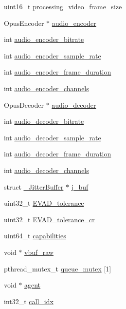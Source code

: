 \begin{DoxyCompactItemize}
\item 
uint16\+\_\+t \hyperlink{struct___c_s_session_a7048faa402d6aecd2626ed85f352f5f2}{processing\+\_\+video\+\_\+frame\+\_\+size}
\item 
Opus\+Encoder $\ast$ \hyperlink{struct___c_s_session_a8c1fa3d73f3426ba5cac83857c390ebc}{audio\+\_\+encoder}
\item 
int \hyperlink{struct___c_s_session_a8951572b99eec737269f5de96f9c5320}{audio\+\_\+encoder\+\_\+bitrate}
\item 
int \hyperlink{struct___c_s_session_ae40829dc4300d79d3b175c8770b769a4}{audio\+\_\+encoder\+\_\+sample\+\_\+rate}
\item 
int \hyperlink{struct___c_s_session_a25f8c6ef812a7edaaadb81b41f8d818d}{audio\+\_\+encoder\+\_\+frame\+\_\+duration}
\item 
int \hyperlink{struct___c_s_session_a8ee56e2e7543722415f21dcc3ace1899}{audio\+\_\+encoder\+\_\+channels}
\item 
Opus\+Decoder $\ast$ \hyperlink{struct___c_s_session_a3b9ee5ac4c354a3e31a8acf7aa1a1b6c}{audio\+\_\+decoder}
\item 
int \hyperlink{struct___c_s_session_a56e0bd5af866e6ba91078960083ac801}{audio\+\_\+decoder\+\_\+bitrate}
\item 
int \hyperlink{struct___c_s_session_a22979ca479f4d3e2660b604805a41833}{audio\+\_\+decoder\+\_\+sample\+\_\+rate}
\item 
int \hyperlink{struct___c_s_session_a245af4e824b82e6e91850ac26ace1230}{audio\+\_\+decoder\+\_\+frame\+\_\+duration}
\item 
int \hyperlink{struct___c_s_session_a81fe9534366c7ea81e8ff6ac729d2ae9}{audio\+\_\+decoder\+\_\+channels}
\item 
struct \hyperlink{struct___jitter_buffer}{\+\_\+\+Jitter\+Buffer} $\ast$ \hyperlink{struct___c_s_session_a7567f0c621b65df3ff9e6f46164ac1c0}{j\+\_\+buf}
\item 
uint32\+\_\+t \hyperlink{struct___c_s_session_a7d48e69ed8663d4dbe8266ff4158a321}{E\+V\+A\+D\+\_\+tolerance}
\item 
uint32\+\_\+t \hyperlink{struct___c_s_session_aa799246d78fac3297846637588131763}{E\+V\+A\+D\+\_\+tolerance\+\_\+cr}
\item 
uint64\+\_\+t \hyperlink{struct___c_s_session_ac9e675ead9b3559ea462414a0016f6a6}{capabilities}
\item 
void $\ast$ \hyperlink{struct___c_s_session_abb525d3cf1486064b35b5821a0646c86}{vbuf\+\_\+raw}
\item 
pthread\+\_\+mutex\+\_\+t \hyperlink{struct___c_s_session_aa1e20c410f3ec23066afb256fa3d1254}{queue\+\_\+mutex} \mbox{[}1\mbox{]}
\item 
void $\ast$ \hyperlink{struct___c_s_session_a18e94ace0074984593ae281f6bbda315}{agent}
\item 
int32\+\_\+t \hyperlink{struct___c_s_session_ad6b287fd08a0cc466cd41bd2e76d5808}{call\+\_\+idx}
\end{DoxyCompactItemize}


